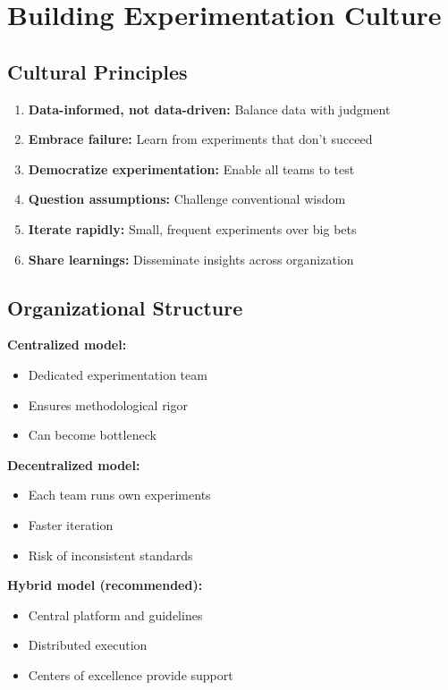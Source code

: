 \section{Building Experimentation Culture}

\subsection{Cultural Principles}

\begin{enumerate}
    \item \textbf{Data-informed, not data-driven:} Balance data with judgment

    \item \textbf{Embrace failure:} Learn from experiments that don't succeed

    \item \textbf{Democratize experimentation:} Enable all teams to test

    \item \textbf{Question assumptions:} Challenge conventional wisdom

    \item \textbf{Iterate rapidly:} Small, frequent experiments over big bets

    \item \textbf{Share learnings:} Disseminate insights across organization
\end{enumerate}

\subsection{Organizational Structure}

\textbf{Centralized model:}
\begin{itemize}
    \item Dedicated experimentation team
    \item Ensures methodological rigor
    \item Can become bottleneck
\end{itemize}

\textbf{Decentralized model:}
\begin{itemize}
    \item Each team runs own experiments
    \item Faster iteration
    \item Risk of inconsistent standards
\end{itemize}

\textbf{Hybrid model (recommended):}
\begin{itemize}
    \item Central platform and guidelines
    \item Distributed execution
    \item Centers of excellence provide support
\end{itemize}

